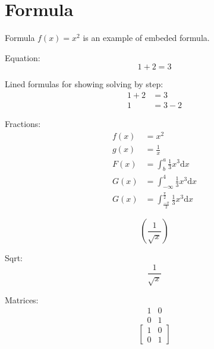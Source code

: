 \chapter{Formula}
Formula $f(x) = x^2$ is an example of embeded formula.

Equation:
\begin{equation*}
  1 + 2 = 3
\end{equation*}

Lined formulas for showing solving by step:
\begin{align*}
  1 + 2 &= 3\\
  1 &= 3 - 2
\end{align*}

Fractions:
\begin{align*}
  f(x) &= x^2\\
  g(x) &= \frac{1}{x}\\
  F(x) &= \int^a_b \frac{1}{3}x^3 \mathrm{d}x\\
  G(x) &= \int^4_{-\infty} \frac{1}{3}x^3 \mathrm{d}x\\
  G(x) &= \int^{\frac{\pi}{2}}_{\frac{-\pi}{2}} \frac{1}{3}x^3 \mathrm{d}x
\end{align*}

\begin{equation*}
  \left(
    \frac{1}{\sqrt{x}}
  \right)
\end{equation*}

Sqrt:
\begin{equation*}
  \frac{1}{\sqrt{x}}
\end{equation*}

Matrices:
\begin{equation*}
  \begin{matrix}
  1 & 0\\
  0 & 1
  \end{matrix}
\end{equation*}
\begin{equation*}
\left[
  \begin{matrix}
  1 & 0\\
  0 & 1
  \end{matrix}
\right]
\end{equation*}